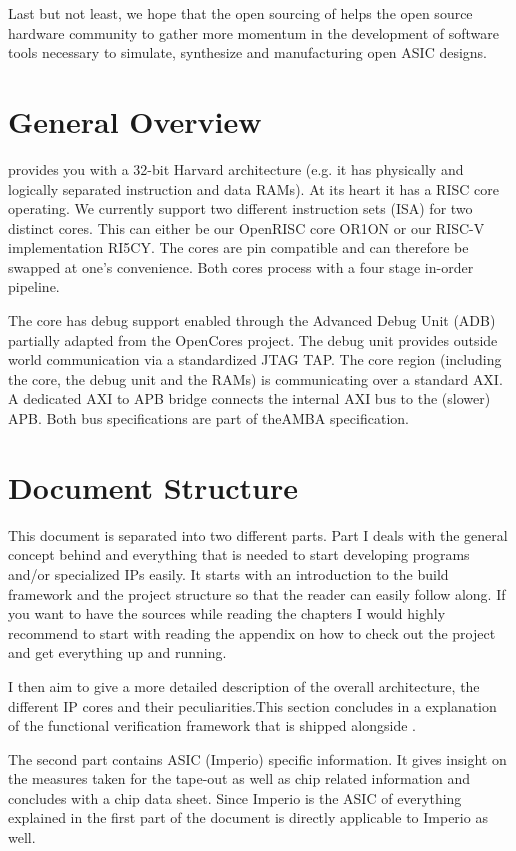 Last but not least, we hope that the open sourcing of \pulpino helps the open source hardware community to gather more momentum in the development of software tools necessary to simulate, synthesize and manufacturing open ASIC designs.


\section{General Overview}

\pulpino provides you with a 32-bit Harvard architecture (e.g. it has physically and logically separated instruction and data RAMs). At its heart it has a \gls{RISC} core operating. We currently support two different instruction sets (ISA) for two distinct cores. This can either be our OpenRISC core OR1ON or our RISC-V implementation RI5CY. The cores are pin compatible and can therefore be swapped at one's convenience. Both cores process with a four stage in-order pipeline.

The core has debug support enabled through the Advanced Debug Unit (ADB) partially adapted from the OpenCores project. The debug unit provides outside world communication via a standardized JTAG TAP. The core region (including the core, the debug unit and the RAMs)
is communicating over a standard \gls{AXI}.
A dedicated AXI to APB bridge connects the internal AXI bus to the (slower) \gls{APB}. Both bus specifications are part of the\gls{AMBA} specification.

\section{Document Structure}

This document is separated into two different parts. Part I deals with the general concept behind \pulpino and everything that is needed to start developing programs and/or specialized IPs easily. It starts with an introduction to the build framework and the project structure so that the reader can easily follow along. If you want to have the sources while reading the chapters I would highly recommend to start with reading the appendix on how to check out the project and get everything up and running.

I then aim to give a more detailed description of the overall architecture, the different IP cores and their peculiarities.This section concludes in a explanation of the functional verification framework that is shipped alongside \pulpino.

The second part contains ASIC (Imperio) specific information. It gives insight on the measures taken for the tape-out as well as chip related information and concludes with a chip data sheet. Since Imperio is the ASIC of \pulpino everything explained in the first part of the document is directly applicable to Imperio as well.

